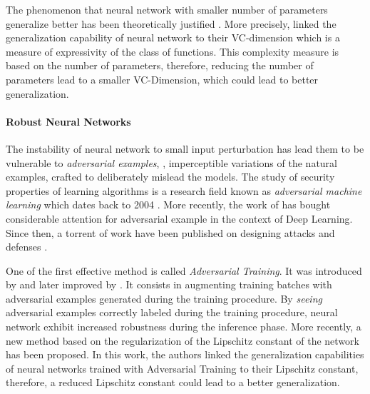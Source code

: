 The phenomenon that neural network with smaller number of parameters generalize better has been theoretically justified \cite{vapnik1982estimation}.
More precisely, \citeauthor{vapnik1982estimation} linked the generalization capability of neural network to their VC-dimension which is a measure of expressivity of the class of functions.
This complexity measure is based on the number of parameters, therefore, reducing the number of parameters lead to a smaller VC-Dimension, which could lead to better generalization.



\paragraph{Robust Neural Networks}

The instability of neural network to small input perturbation has lead them to be vulnerable to \emph{adversarial examples}, \ie, imperceptible variations of the natural examples, crafted to deliberately mislead the models.
The study of security properties of learning algorithms is a research field known as \emph{adversarial machine learning} which dates back to 2004 \cite{dalvi2004adversarial}.
More recently, the work of \citet{szegedy2013intriguing} has bought considerable attention for adversarial example in the context of Deep Learning. Since then, a torrent of work have been published on designing attacks and defenses \cite{szegedy2013intriguing,goodfellow2014explaining,papernot2016limitations,madry2018towards,carlini2017towards,pinot2019theoretical}.

One of the first effective method is called \emph{Adversarial Training}.
It was introduced by \citet{goodfellow2014explaining} and later improved by \citet{madry2018towards}.
It consists in augmenting training batches with adversarial examples generated during the training procedure.
By \emph{seeing} adversarial examples correctly labeled during the training procedure, neural network exhibit increased robustness during the inference phase.
More recently, a new method \cite{farnia2018generalizable} based on the regularization of the Lipschitz constant of the network has been proposed.
In this work, the authors linked the generalization capabilities of neural networks trained with Adversarial Training to their Lipschitz constant, therefore, a reduced Lipschitz constant could lead to a better generalization.







